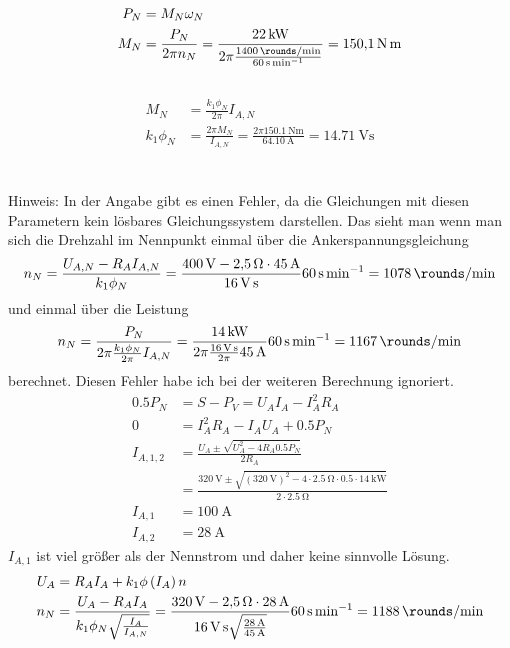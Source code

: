\documentclass[11pt,a4paper]{scrartcl}
\newcommand{\mybr}[1]{\left(#1\right)}
\newcommand{\0}{_{\mybr{0}}}
\newcommand{\1}{_{\mybr{1}}}
\newcommand{\2}{_{\mybr{2}}}
\begin{document}
\subsection{}
\begin{align}
P_N&=M_N \omega_N\\
M_N&=\frac{P_N}{2\pi n_N}=\frac{\SI{22}{\kilo\watt}}{2\pi\frac{\SI{1400}{\rounds\per\minute}}{\SI{60}{\second\per\minute}}}=\SI{150.1}{\newton\metre}
\end{align}

\subsection{}
\begin{align}
M_N&=\frac{k_1\phi_N}{2\pi}I_{A,N}\\
k_1\phi_N&=\frac{2\pi M_N}{I_{A,N}}=\frac{2\pi \SI{150.1}{\newton\metre}}{\SI{64.10}{\ampere}}=\SI{14.71}{\volt\second}
\end{align}

\section{}
Hinweis: In der Angabe gibt es einen Fehler, da die Gleichungen mit diesen Parametern kein lösbares Gleichungssystem darstellen. Das sieht man wenn man sich die Drehzahl im Nennpunkt einmal über die Ankerspannungsgleichung
\begin{equation}
n_N=\frac{U_{A,N}-R_A I_{A,N}}{k_1\phi_N}=\frac{\SI{400}{\volt}-\SI{2.5}{\ohm}\cdot\SI{45}{\ampere}}{\SI{16}{\volt\second}}\SI{60}{\second\per\minute}=\SI{1078}{\rounds\per\minute}
\end{equation}
und einmal über die Leistung
\begin{equation}
n_N=\frac{P_N}{2\pi\frac{k_1\phi_N}{2\pi}I_{A,N}}=\frac{\SI{14}{\kilo\watt}}{2\pi\frac{\SI{16}{\volt\second}}{2\pi}\SI{45}{\ampere}}\SI{60}{\second\per\minute}=\SI{1167}{\rounds\per\minute}
\end{equation}
berechnet. Diesen Fehler habe ich bei der weiteren Berechnung ignoriert.
\begin{align}
\num{0.5}P_N&=S-P_V=U_A I_A - I_A^2 R_A\\
0&=I_A^2 R_A - I_A U_A + \num{0.5}P_N\\
I_{A,1,2}&=\frac{U_A\pm\sqrt{U_A^2-4 R_A \num{0.5}P_N}}{2 R_A}\\
&=\frac{\SI{320}{\volt}\pm\sqrt{\mybr{\SI{320}{\volt}}^2-4 \cdot \SI{2.5}{\ohm}\cdot \num{0.5}\cdot\SI{14}{\kilo\watt}}}{2 \cdot \SI{2.5}{\ohm}}\\
I_{A,1}&=\SI{100}{\ampere}\\
I_{A,2}&=\SI{28}{\ampere}
\end{align}
$I_{A,1}$ ist viel größer als der Nennstrom und daher keine sinnvolle Lösung.
\begin{align}
U_A&=R_A I_A + k_1\phi\mybr{I_A} n\\
n_N&=\frac{U_A-R_A I_A}{k_1\phi_N\sqrt{\frac{I_A}{I_{A,N}}}}=\frac{\SI{320}{\volt}-\SI{2.5}{\ohm}\cdot\SI{28}{\ampere}}{\SI{16}{\volt\second}\sqrt{\frac{\SI{28}{\ampere}}{\SI{45}{\ampere}}}}\SI{60}{\second\per\minute}=\SI{1188}{\rounds\per\minute}
\end{align}
\end{document}
